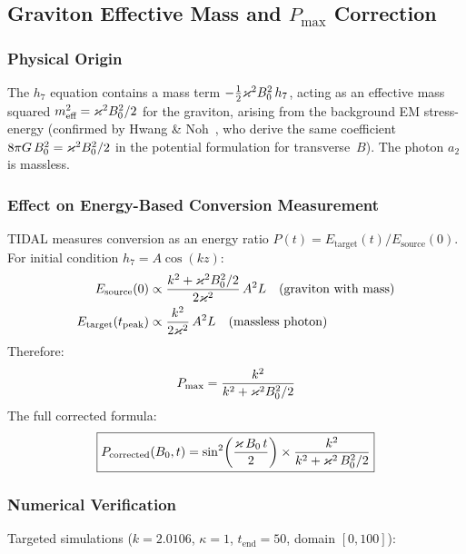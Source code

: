 \subsection{Graviton Effective Mass and $P_\text{max}$ Correction}
\label{sec:mass-correction}

\subsubsection{Physical Origin}

The $h_7$ equation contains a mass term $-\tfrac{1}{2}\varkappa^2 B_0^2\, h_7$, acting as an effective mass squared $m_\text{eff}^2 = \varkappa^2 B_0^2/2$ for the graviton, arising from the background EM stress-energy (confirmed by Hwang \& Noh~\cite{hwangnoh2023graviton}, who derive the same coefficient $8\pi G\,B_0^2 = \varkappa^2B_0^2/2$ in the potential formulation for transverse~$B$). The photon $a_2$ is massless.

\subsubsection{Effect on Energy-Based Conversion Measurement}

TIDAL measures conversion as an energy ratio $P(t) = E_\text{target}(t) / E_\text{source}(0)$. For initial condition $h_7 = A\cos(kz)$:
\begin{align}
  E_\text{source}(0) &\propto \frac{k^2 + \varkappa^2B_0^2/2}{2\varkappa^2}\, A^2 L \quad\text{(graviton with mass)} \\
  E_\text{target}(t_\text{peak}) &\propto \frac{k^2}{2\varkappa^2}\, A^2 L \quad\text{(massless photon)}
\end{align}
Therefore:
\begin{equation}
  P_\text{max} = \frac{k^2}{k^2 + \varkappa^2 B_0^2 / 2}
  \label{eq:Pmax}
\end{equation}
The full corrected formula:
\begin{equation}
  \boxed{P_\text{corrected}(B_0, t) = \sin^2\!\left(\frac{\varkappa\,B_0\, t}{2}\right) \times \frac{k^2}{k^2 + \varkappa^2\,B_0^2/2}}
  \label{eq:P-corrected}
\end{equation}

\subsubsection{Numerical Verification}

Targeted simulations ($k = 2.0106$, $\kappa = 1$, $t_\text{end} = 50$, domain $[0,100]$):

